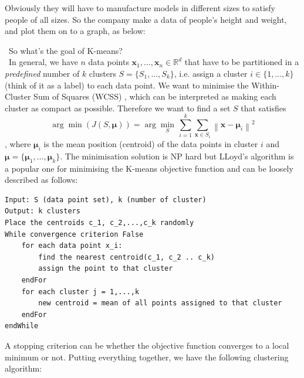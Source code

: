 \documentclass[a4paper]{article}
\begin{document}
Obviously they will have to manufacture models in different sizes to satisfy people of all sizes. So the company make a data of people’s height and weight, and plot them on to a graph, as below:




\faQuestionCircle \ So what's the goal of K-means?\\
\faCheckCircle \ In general, we have $n$ data points $\textbf{x}_1,\ldots,\textbf{x}_n \in \mathbb{R}^d$ that have to be partitioned in a \textit{predefined} number of $k$ clusters $S=\{S_1, \ldots, S_k \}$, i.e. assign a cluster $i\in \{1,\ldots,k \}$ (think of it as a label) to each data point. We want to minimise the Within-Cluster Sum of Squares (WCSS) , which can be interpreted as making each cluster as compact as possible. Therefore we want to find a set $S$ that satisfies
\[
\arg\min \left( J(S,\boldsymbol{\mu}) \right) = \arg \underset{S}{\mathop{\min }}\,\sum\limits_{i=1}^{k}{\sum\limits_{\mathbf{x}\in S_i}^{{}}{{{\left\| \mathbf{x}-{{  \boldsymbol{\mu}  }_{i}} \right\|}^{2}}}}
\]
, where $\boldsymbol{\mu}_i$ is the mean position (centroid) of the data points in cluster $i$ and $\boldsymbol{\mu} = \{\boldsymbol{\mu}_1,\ldots, \boldsymbol{\mu}_k \}$. The minimisation solution is NP hard but LLoyd's algorithm is a popular one for minimising the K-means objective function and can be loosely described as follows:
\begin{verbatim}
Input: S (data point set), k (number of cluster)
Output: k clusters
Place the centroids c_1, c_2,...,c_k randomly 
While convergence criterion False
    for each data point x_i:
        find the nearest centroid(c_1, c_2 .. c_k) 
        assign the point to that cluster 
    endFor
    for each cluster j = 1,...,k
        new centroid = mean of all points assigned to that cluster
    endFor
endWhile
\end{verbatim}
A stopping criterion can be whether the objective function converges to a local minimum or not. Putting everything together, we have the following clustering algorithm:
\end{document}
